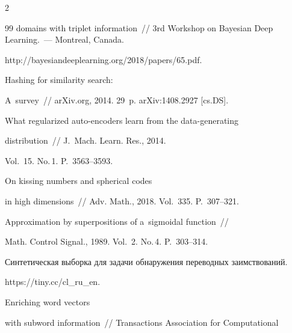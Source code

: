 \begin{multicols}{2}
{{\begin{thebibliography}{99}
domains with triplet information~// 3rd Workshop on Bayesian Deep Learning.~--- Montreal, Canada. 


{\sf http://bayesiandeeplearning.org/2018/papers/65.pdf}.










 Hashing for similarity search: 


A~survey~// arXiv.org, 2014. 29~p. \mbox{arXiv}:1408.2927 [cs.DS].










 What regularized auto-encoders learn from the data-generating 


distribution~// J.~Mach. Learn. Res., 2014. 


Vol.~15. No.\,1. P.~3563--3593.










 On kissing numbers and spherical codes 


in high dimensions~// Adv.  Math., 2018. Vol.~335. P.~307--321.










 Approximation by superpositions of a~sigmoidal function~// 


Math. Control Signal., 1989. Vol.~2. No.\,4. P.~303--314.







Синтетическая выборка для задачи обнаружения переводных заимствований. 


{\sf https://tiny.cc/cl\_ru\_en}.










 Enriching word vectors 


with subword information~// Transactions Association for Computational 



\end{thebibliography}}}
\end{multicols}
